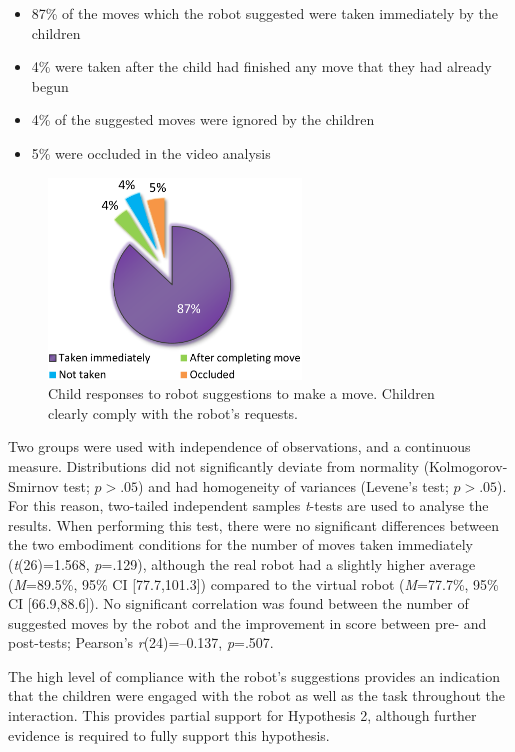 \begin{itemize}
	\item 87\% of the moves which the robot suggested were taken immediately by the children
	\item 4\% were taken after the child had finished any move that they had already begun
	\item 4\% of the suggested moves were ignored by the children
	\item 5\% were occluded in the video analysis
\end{itemize}

\begin{figure}[t!]
    \centering
    \includegraphics[width=0.6\textwidth]{images/ch6_PieChart.pdf}
    \caption{Child responses to robot suggestions to make a move. Children clearly comply with the robot's requests.}
    \label{fig:ch6-piechart}
\end{figure}

Two groups were used with independence of observations, and a continuous measure. Distributions did not significantly deviate from normality (Kolmogorov-Smirnov test; $\textit{p}>.05$) and had homogeneity of variances (Levene's test; $\textit{p}>.05$). For this reason, two-tailed independent samples \textit{t}-tests are used to analyse the results. When performing this test, there were no significant differences between the two embodiment conditions for the number of moves taken immediately (\textit{t}(26)=1.568, \textit{p}=.129), although the real robot had a slightly higher average (\textit{M}=89.5\%, 95\% CI [77.7,101.3]) compared to the virtual robot (\textit{M}=77.7\%, 95\% CI [66.9,88.6]). No significant correlation was found between the number of suggested moves by the robot and the improvement in score between pre- and post-tests; Pearson's \textit{r}(24)=--0.137, \textit{p}=.507.

The high level of compliance with the robot's suggestions provides an indication that the children were engaged with the robot as well as the task throughout the interaction. This provides partial support for Hypothesis 2, although further evidence is required to fully support this hypothesis.

